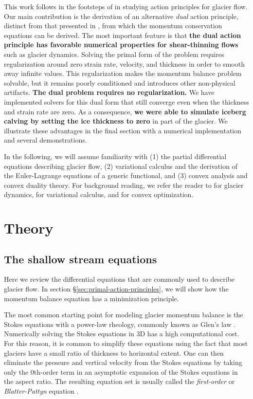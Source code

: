 \documentclass[twocolumn,letterpaper]{igs}
\begin{document}
This work follows in the footsteps of \citet{dukowicz2010consistent} in studying action principles for glacier flow.
Our main contribution is the derivation of an alternative \emph{dual} action principle, distinct from that presented in \citet{dukowicz2010consistent}, from which the momentum conservation equations can be derived.
The most important feature is that \textbf{the dual action principle has favorable numerical properties for shear-thinning flows} such as glacier dynamics.
Solving the primal form of the problem requires regularization around zero strain rate, velocity, and thickness in order to smooth away infinite values.
This regularization makes the momentum balance problem solvable, but it remains poorly conditioned and introduces other non-physical artifacts.
\textbf{The dual problem requires no regularization.}
We have implemented solvers for this dual form that still converge even when the thickness and strain rate are zero.
As a consequence, \textbf{we were able to simulate iceberg calving by setting the ice thickness to zero} in part of the glacier.
We illustrate these advantages in the final section with a numerical implementation and several demonstrations.

In the following, we will assume familiarity with (1) the partial differential equations describing glacier flow, (2) variational calculus and the derivation of the Euler-Lagrange equations of a generic functional, and (3) convex analysis and convex duality theory.
For background reading, we refer the reader to \citet{greve2009dynamics} for glacier dynamics, \citet{weinstock1974calculus} for variational calculus, and \citet{boyd2004convex} for convex optimization.



\section{Theory}

\subsection{The shallow stream equations}

Here we review the differential equations that are commonly used to describe glacier flow.
In section \S\ref{sec:primal-action-principles}, we will show how the momentum balance equation has a minimization principle.

The most common starting point for modeling glacier momentum balance is the Stokes equations with a power-law rheology, commonly known as Glen's law \citep{glen1958law, greve2009dynamics}.
Numerically solving the Stokes equations in 3D has a high computational cost.
For this reason, it is common to simplify these equations using the fact that most glaciers have a small ratio of thickness to horizontal extent.
One can then eliminate the pressure and vertical velocity from the Stokes equations by taking only the 0th-order term in an asymptotic expansion of the Stokes equations in the aspect ratio.
The resulting equation set is usually called the \emph{first-order} or \emph{Blatter-Pattyn} equation \citep{greve2009dynamics}.
\end{document}
